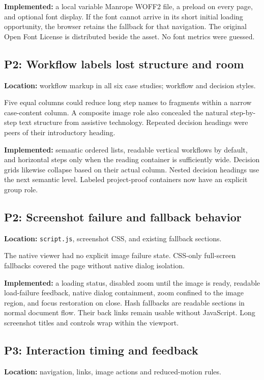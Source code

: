 \documentclass[11pt,a4paper]{article}
\newcommand{\file}[1]{\nolinkurl{#1}}
\begin{document}
\textbf{Implemented:} a local variable Manrope WOFF2 file, a preload on every page, and optional font display. If the font cannot arrive in its short initial loading opportunity, the browser retains the fallback for that navigation. The original Open Font License is distributed beside the asset. No font metrics were guessed.

\subsection{P2: Workflow labels lost structure and room}
\textbf{Location:} workflow markup in all six case studies; workflow and decision styles.

Five equal columns could reduce long step names to fragments within a narrow case-content column. A composite image role also concealed the natural step-by-step text structure from assistive technology. Repeated decision headings were peers of their introductory heading.

\textbf{Implemented:} semantic ordered lists, readable vertical workflows by default, and horizontal steps only when the reading container is sufficiently wide. Decision grids likewise collapse based on their actual column. Nested decision headings use the next semantic level. Labeled project-proof containers now have an explicit group role.

\subsection{P2: Screenshot failure and fallback behavior}
\textbf{Location:} \file{script.js}, screenshot CSS, and existing fallback sections.

The native viewer had no explicit image failure state. CSS-only full-screen fallbacks covered the page without native dialog isolation.

\textbf{Implemented:} a loading status, disabled zoom until the image is ready, readable load-failure feedback, native dialog containment, zoom confined to the image region, and focus restoration on close. Hash fallbacks are readable sections in normal document flow. Their back links remain usable without JavaScript. Long screenshot titles and controls wrap within the viewport.

\subsection{P3: Interaction timing and feedback}
\textbf{Location:} navigation, links, image actions and reduced-motion rules.
\end{document}
